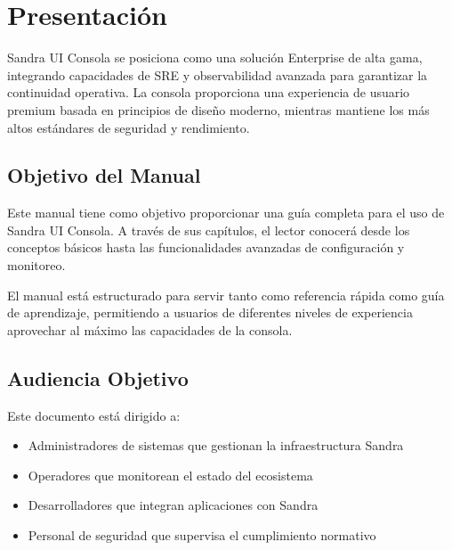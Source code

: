 
\chapter*{Presentación}

Sandra UI Consola se posiciona como una solución Enterprise de alta gama, integrando capacidades de SRE y observabilidad avanzada para garantizar la continuidad operativa. La consola proporciona una experiencia de usuario premium basada en principios de diseño moderno, mientras mantiene los más altos estándares de seguridad y rendimiento.

\section*{Objetivo del Manual}

Este manual tiene como objetivo proporcionar una guía completa para el uso de Sandra UI Consola. A través de sus capítulos, el lector conocerá desde los conceptos básicos hasta las funcionalidades avanzadas de configuración y monitoreo.

El manual está estructurado para servir tanto como referencia rápida como guía de aprendizaje, permitiendo a usuarios de diferentes niveles de experiencia aprovechar al máximo las capacidades de la consola.

\section*{Audiencia Objetivo}

Este documento está dirigido a:

\begin{itemize}
    \item Administradores de sistemas que gestionan la infraestructura Sandra
    \item Operadores que monitorean el estado del ecosistema
    \item Desarrolladores que integran aplicaciones con Sandra
    \item Personal de seguridad que supervisa el cumplimiento normativo
\end{itemize}

\clearpage
